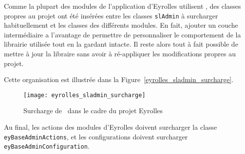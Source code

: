Comme la plupart des modules de l'application d'Eyrolles utilisent \asladmin, des classes propres au projet ont été insérées entre les classes \texttt{slAdmin} à surcharger habituellement et les classes des différents modules. En fait, ajouter un couche intermédiaire a l'avantage de permettre de personnaliser le comportement de la librairie utilisée tout en la gardant intacte. Il reste alors tout à fait possible de mettre à jour la libraire sans avoir à ré-appliquer les modifications propres au projet.

Cette organisation est illustrée dans la Figure~\ref{eyrolles_sladmin_surcharge}.

\begin{figure}
	\centering
	\texttt{[image: eyrolles\_sladmin\_surcharge]}
	\caption{Surcharge de \asladmin\ dans le cadre du projet Eyrolles}
	\label{figure:eyrolles_sladmin_surcharge}
\end{figure}

Au final, les actions des modules d'Eyrolles doivent surcharger la classe \texttt{eyBaseAdminActions}, et les configurations doivent surcharger\\ \texttt{eyBaseAdminConfiguration}.
